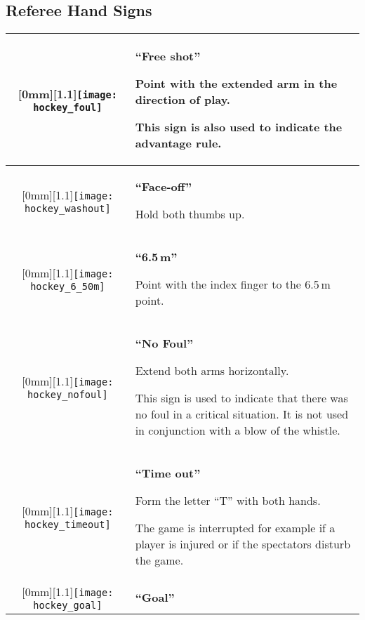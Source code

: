 \subsection{Referee Hand Signs}
\renewcommand{\arraystretch}{1.5}
\begin{longtable}{|c|p{10.8cm}|}

\hline %

\raisebox{-\height}[0mm][1.1\height]{\texttt{[image: hockey\_foul]}}
&
\textbf{``Free shot''}

Point with the extended arm in the direction of play.

This sign is also used to indicate the advantage rule.\\

\hline %

\raisebox{-\height}[0mm][1.1\height]{\texttt{[image: hockey\_washout]}}
&
\textbf{``Face-off''}

Hold both thumbs up.\\

\hline %

\raisebox{-\height}[0mm][1.1\height]{\texttt{[image: hockey\_6\_50m]}}
&
\textbf{``6.5\,m''}

Point with the index finger to the 6.5\,m point.\\

\hline %

\raisebox{-\height}[0mm][1.1\height]{\texttt{[image: hockey\_nofoul]}}
&
\textbf{``No Foul''}

Extend both arms horizontally.

This sign is used to indicate that there was no foul in a critical situation.
It is not used in conjunction with a blow of the whistle.\\

\hline %

\raisebox{-\height}[0mm][1.1\height]{\texttt{[image: hockey\_timeout]}}
&
\textbf{``Time out''}

Form the letter ``T'' with both hands.

The game is interrupted for example if a player is injured or if the spectators disturb the game.\\

\hline %

\raisebox{-\height}[0mm][1.1\height]{\texttt{[image: hockey\_goal]}}
&
\textbf{``Goal''}


\end{longtable}
